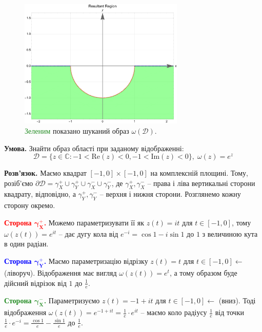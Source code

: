 \documentclass[oneside,solution]{karazin-complan-assign}
\begin{document}
\begin{figure}
    \centering
    \includegraphics[width=0.7\textwidth]{images/hw_5/problem_1(2).pdf}
    \caption{\textcolor{ForestGreen}{Зеленим} показано шуканий образ $\omega(\mathcal{D})$.}
    \label{fig:1(2)}
\end{figure}


\hspace{20px}\textbf{Умова.} Знайти образ області при заданому відображенні:
\begin{equation}
    \mathcal{D} = \{z \in \mathbb{C}: -1 < \text{Re}(z) < 0, -1 < \text{Im}(z)< 0\}, \; \omega(z) = e^z
\end{equation}

\textbf{Розв'язок.} Маємо квадрат $[-1,0] \times [-1,0]$ на комплексній площині. Тому, розіб'ємо $\partial\mathcal{D} = \gamma_X^+ \cup \gamma_Y^+ \cup \gamma_X^- \cup \gamma_Y^-$, де $\gamma_X^+,\gamma_X^-$ -- права і ліва вертикальні сторони квадрату, відповідно, а $\gamma_Y^+,\gamma_Y^-$ -- верхня і нижня сторони. Розглянемо кожну сторону окремо.

\textcolor{red}{\textbf{Сторона $\boldsymbol{\gamma_X^+}$.}} Можемо параметризувати її як $z(t) = it$ для $t \in [-1,0]$, тому $\omega(z(t)) = e^{it}$ -- дає дугу кола від $e^{-i}=\cos 1 - i\sin 1$ до $1$ з величиною кута в один радіан.

\textcolor{blue}{\textbf{Сторона $\boldsymbol{\gamma_Y^+}$.}} Маємо параметризацію відрізку $z(t) = t$ для $t \in [-1,0] \xleftarrow[]{}$ (ліворуч). Відображення має вигляд $\omega(z(t))=e^t$, а тому образом буде дійсний відрізок від $1$ до $\frac{1}{e}$.

\textcolor{ForestGreen}{\textbf{Сторона $\boldsymbol{\gamma_X^-}$.}} Параметризуємо $z(t) = -1 + it$ для $t \in [-1,0] \xleftarrow[]{}$ (вниз). Тоді відображення $\omega(z(t))=e^{-1+it} = \frac{1}{e} \cdot e^{it}$ -- маємо коло радіусу $\frac{1}{e}$ від точки $\frac{1}{e} \cdot e^{-i}=\frac{\cos 1}{e} - \frac{\sin 1}{e}$ до $\frac{1}{e}$. 
\end{document}
